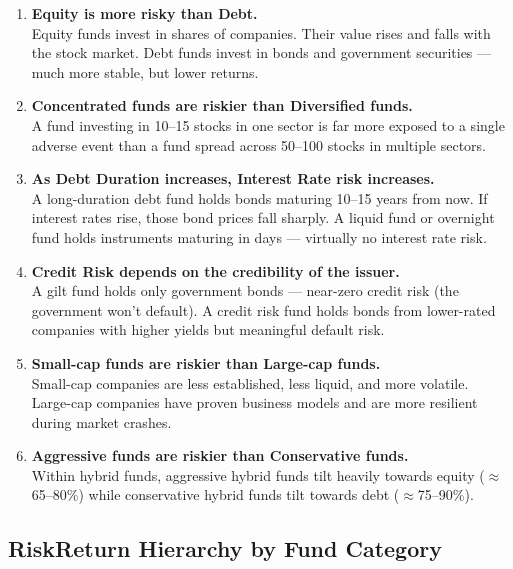 \documentclass[12pt,a4paper]{article}
\begin{document}
\begin{enumerate}[leftmargin=*, label=\textbf{\arabic*.}]
  \item \textbf{Equity is more risky than Debt.}\\
  Equity funds invest in shares of companies. Their value rises and falls with the stock market. Debt funds invest in bonds and government securities --- much more stable, but lower returns.

  \item \textbf{Concentrated funds are riskier than Diversified funds.}\\
  A fund investing in 10--15 stocks in one sector is far more exposed to a single adverse event than a fund spread across 50--100 stocks in multiple sectors.

  \item \textbf{As Debt Duration increases, Interest Rate risk increases.}\\
  A long-duration debt fund holds bonds maturing 10--15 years from now. If interest rates rise, those bond prices fall sharply. A liquid fund or overnight fund holds instruments maturing in days --- virtually no interest rate risk.

  \item \textbf{Credit Risk depends on the credibility of the issuer.}\\
  A gilt fund holds only government bonds --- near-zero credit risk (the government won't default). A credit risk fund holds bonds from lower-rated companies with higher yields but meaningful default risk.

  \item \textbf{Small-cap funds are riskier than Large-cap funds.}\\
  Small-cap companies are less established, less liquid, and more volatile. Large-cap companies have proven business models and are more resilient during market crashes.

  \item \textbf{Aggressive funds are riskier than Conservative funds.}\\
  Within hybrid funds, aggressive hybrid funds tilt heavily towards equity ($\approx$65--80\%) while conservative hybrid funds tilt towards debt ($\approx$75--90\%).
\end{enumerate}

\vspace{3mm}

\subsection{Risk\textendash{}Return Hierarchy by Fund Category}
\end{document}
